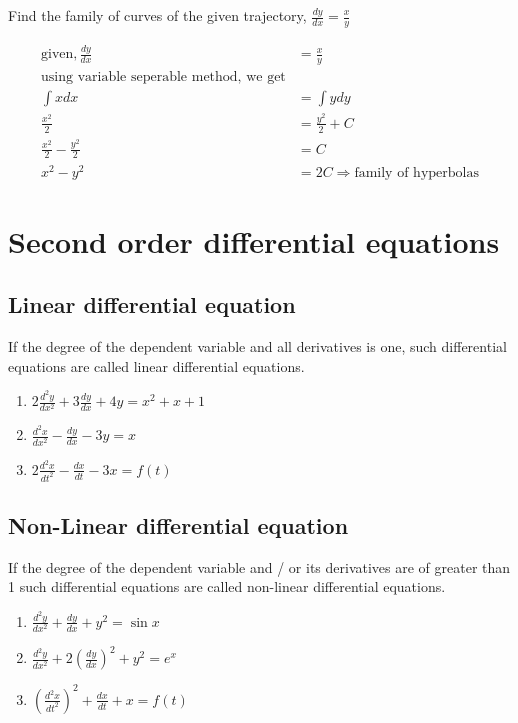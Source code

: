 \begin{exercise}
	Find the family of curves of the given trajectory,	$\frac{dy}{dx}=\frac{x}{y}$
\end{exercise}
\begin{answer}
\begin{align*}
\text{given},\frac{dy}{dx}&=\frac{x}{y}\\
\text{using variable seperable method, we get}\\
\int xdx&=\int ydy\\
\frac{x^{2}}{2}&=\frac{y^{2}}{2}+C\\
\frac{x^{2}}{2}-\frac{y^{2}}{2}&=C\\
x^{2}-y^{2}&=2C\Longrightarrow \text{family of hyperbolas}
\end{align*}
\end{answer}
\section{Second order differential equations}
\subsection{Linear differential equation}
If the degree of the dependent variable and all derivatives is one, such differential equations are called linear differential equations.
\begin{example}\hspace{0.5cm}
	\begin{enumerate}
		\item $2\frac{d^{2} y}{d x^{2}}+3\frac{d y}{d x}+4 y=x^{2}+x+1$
		\item $ \frac{d^{2} x}{d x^{2}}-\frac{d y}{d x}-3 y=x$
		\item $2 \frac{d^{2} x}{d t^{2}}-\frac{d x}{d t}-3 x=f(t)$
	\end{enumerate}
\end{example}
\subsection{Non-Linear differential equation}
If the degree of the dependent variable and / or its derivatives are of greater than 1 such differential equations are called non-linear differential equations.
\begin{example}\hspace{0.5cm}
	\begin{enumerate}
		\item $\frac{d^{2} y}{d x^{2}}+\frac{d y}{d x}+y^{2}=\sin x$
		\item  $\frac{d^{2} y}{d x^{2}}+2\left(\frac{d y}{d x}\right)^{2}+y^{2}=e^{x}$
		\item  $\left(\frac{d^{2} x}{d t^{2}}\right)^{2}+\frac{d x}{d t}+x=f(t)$
	\end{enumerate}
\end{example}
